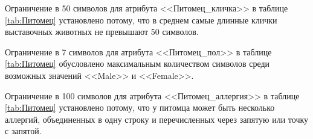 \documentclass[a4paper]{article}
\begin{document}
\begin{table}[H]
  \caption{Владелец - owner}
  \label{tab:Владелец}
\end{table}

Ограничение в 50 символов для атрибута <<Питомец\_кличка>> в таблице \ref{tab:Питомец} установлено потому, что в среднем самые длинные клички выставочных животных не превышают 50 символов. 

Ограничение в 7 символов для атрибута <<Питомец\_пол>> в таблице \ref{tab:Питомец} обусловлено максимальным количеством символов среди возможных значений <<Male>> и <<Female>>.

Ограничение в 100 символов для атрибута <<Питомец\_аллергия>> в таблице \ref{tab:Питомец} установлено потому, что у питомца может быть несколько аллергий, объединенных в одну строку и перечисленных через запятую или точку с запятой.
\end{document}
